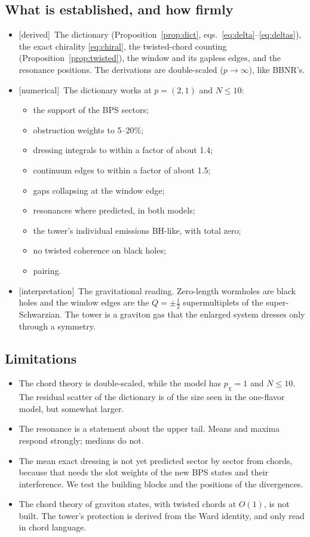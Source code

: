 \documentclass[11pt]{article}
\newcommand{\tagbox}[2]{\textsf{\small\color{#1}[#2]}}
\newcommand{\DER}{\tagbox{cder}{derived}}
\newcommand{\NUM}{\tagbox{cnum}{numerical}}
\newcommand{\INTERP}{\tagbox{cconj}{interpretation}}
\theoremstyle{plain}
\theoremstyle{remark}
\numberwithin{equation}{section}
\begin{document}
\subsection{What is established, and how firmly}
\begin{itemize}\itemsep2pt
\item \DER\ The dictionary (Proposition~\ref{prop:dict}, eqs.~\eqref{eq:delta}--\eqref{eq:deltas}), the exact chirality
  \eqref{eq:chiral}, the twisted-chord counting (Proposition~\ref{prop:twisted}), the window and its gapless edges, and the
  resonance positions. The derivations are double-scaled ($p\to\infty$), like BBNR's.
\item \NUM\ The dictionary works at $p=(2,1)$ and $N\le10$:
  \begin{itemize}\itemsep1pt
  \item the support of the BPS sectors;
  \item obstruction weights to 5--20\%;
  \item dressing integrals to within a factor of about 1.4;
  \item continuum edges to within a factor of about 1.5;
  \item gaps collapsing at the window edge;
  \item resonances where predicted, in both models;
  \item the tower's individual emissions BH-like, with total zero;
  \item no twisted coherence on black holes;
  \item pairing.
  \end{itemize}
\item \INTERP\ The gravitational reading. Zero-length wormholes are black holes and the window edges are the $Q=\pm\frac12$
  supermultiplets of the super-Schwarzian. The tower is a graviton gas that the enlarged system dresses only through a
  symmetry.
\end{itemize}

\subsection{Limitations}
\begin{itemize}\itemsep1pt
\item The chord theory is double-scaled, while the model has $p_\chi=1$ and $N\le10$. The residual scatter of the
  dictionary is of the size seen in the one-flavor model, but somewhat larger.
\item The resonance is a statement about the upper tail. Means and maxima respond strongly; medians do not.
\item The mean exact dressing is not yet predicted sector by sector from chords, because that needs the slot weights of
  the new BPS states and their interference. We test the building blocks and the positions of the divergences.
\item The chord theory of graviton states, with twisted chords at $O(1)$, is not built. The tower's protection is
  derived from the Ward identity, and only read in chord language.
\end{itemize}
\end{document}
